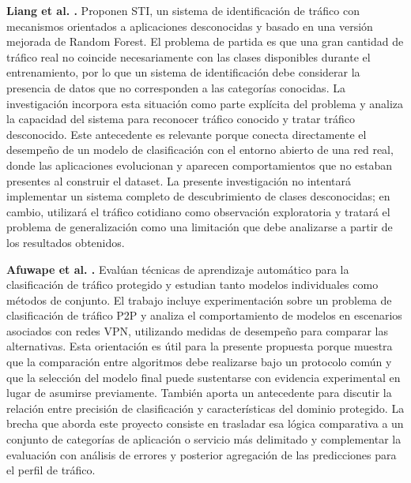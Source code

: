 \documentclass[conference]{IEEEtran}
\begin{document}
\textbf{Liang et al. \cite{liang2024}.} Proponen STI, un sistema de identificación de tráfico con mecanismos orientados a aplicaciones desconocidas y basado en una versión mejorada de Random Forest. El problema de partida es que una gran cantidad de tráfico real no coincide necesariamente con las clases disponibles durante el entrenamiento, por lo que un sistema de identificación debe considerar la presencia de datos que no corresponden a las categorías conocidas. La investigación incorpora esta situación como parte explícita del problema y analiza la capacidad del sistema para reconocer tráfico conocido y tratar tráfico desconocido. Este antecedente es relevante porque conecta directamente el desempeño de un modelo de clasificación con el entorno abierto de una red real, donde las aplicaciones evolucionan y aparecen comportamientos que no estaban presentes al construir el dataset. La presente investigación no intentará implementar un sistema completo de descubrimiento de clases desconocidas; en cambio, utilizará el tráfico cotidiano como observación exploratoria y tratará el problema de generalización como una limitación que debe analizarse a partir de los resultados obtenidos.

\textbf{Afuwape et al. \cite{afuwape2021}.} Evalúan técnicas de aprendizaje automático para la clasificación de tráfico protegido y estudian tanto modelos individuales como métodos de conjunto. El trabajo incluye experimentación sobre un problema de clasificación de tráfico P2P y analiza el comportamiento de modelos en escenarios asociados con redes VPN, utilizando medidas de desempeño para comparar las alternativas. Esta orientación es útil para la presente propuesta porque muestra que la comparación entre algoritmos debe realizarse bajo un protocolo común y que la selección del modelo final puede sustentarse con evidencia experimental en lugar de asumirse previamente. También aporta un antecedente para discutir la relación entre precisión de clasificación y características del dominio protegido. La brecha que aborda este proyecto consiste en trasladar esa lógica comparativa a un conjunto de categorías de aplicación o servicio más delimitado y complementar la evaluación con análisis de errores y posterior agregación de las predicciones para el perfil de tráfico.
\end{document}
